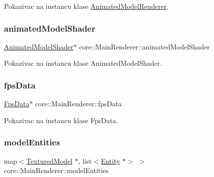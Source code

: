 Pokazivac na instancu klase \hyperlink{classcore_1_1AnimatedModelRenderer}{Animated\+Model\+Renderer}. 

\mbox{\label{classcore_1_1MainRenderer_a877b54b83993c0b0550f5ec5517330cc}} 
\subsubsection{\texorpdfstring{animated\+Model\+Shader}{animatedModelShader}}
{\footnotesize\ttfamily \hyperlink{classshader_1_1AnimatedModelShader}{Animated\+Model\+Shader}$\ast$ core\+::\+Main\+Renderer\+::animated\+Model\+Shader\hspace{0.3cm}{\ttfamily [private]}}



Pokazivac na instancu klase Animated\+Model\+Shader. 

\mbox{\label{classcore_1_1MainRenderer_a0ea0659ecfb85286fb5f2bb1d8dc1be1}} 
\subsubsection{\texorpdfstring{fps\+Data}{fpsData}}
{\footnotesize\ttfamily \hyperlink{classutility_1_1FpsData}{Fps\+Data}$\ast$ core\+::\+Main\+Renderer\+::fps\+Data\hspace{0.3cm}{\ttfamily [private]}}



Pokazivac na instancu klase Fps\+Data. 

\mbox{\label{classcore_1_1MainRenderer_ab98c73a5c79cb0017ae5a7f307c9aafe}} 
\subsubsection{\texorpdfstring{model\+Entities}{modelEntities}}
{\footnotesize\ttfamily map$<$\hyperlink{classmodel_1_1TexturedModel}{Textured\+Model} $\ast$, list$<$\hyperlink{classentity_1_1Entity}{Entity} $\ast$$>$ $>$ core\+::\+Main\+Renderer\+::model\+Entities\hspace{0.3cm}{\ttfamily [private]}}



